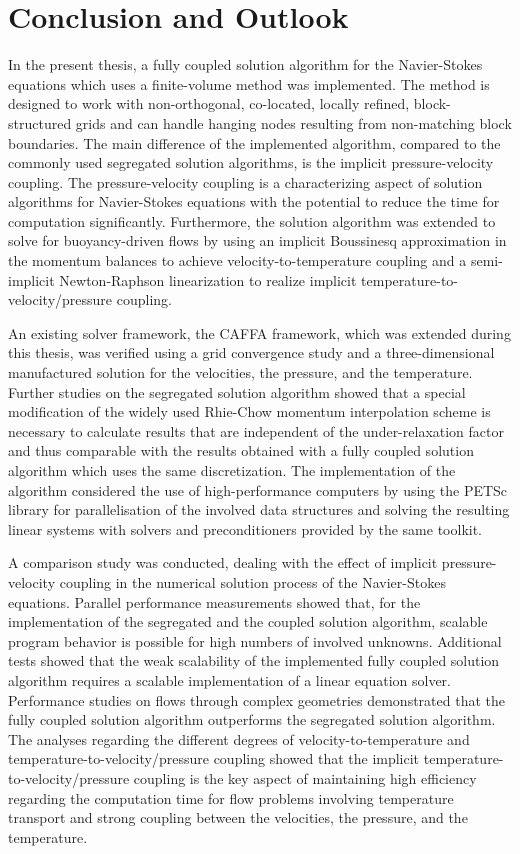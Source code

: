 \chapter{Conclusion and Outlook}
\label{sec:conclusion}

In the present thesis, a fully coupled solution algorithm for the Navier-Stokes equations which uses a finite-volume method was implemented. The method is designed to work with non-orthogonal, co-located, locally refined, block-structured grids and can handle hanging nodes resulting from non-matching block boundaries. The main difference of the implemented algorithm, compared to the commonly used segregated solution algorithms, is the implicit pressure-velocity coupling. The pressure-velocity coupling is a characterizing aspect of solution algorithms for Navier-Stokes equations with the potential to reduce the time for computation significantly. Furthermore, the solution algorithm was extended to solve for buoyancy-driven flows by using an implicit Boussinesq approximation in the momentum balances to achieve velocity-to-temperature coupling and a semi-implicit Newton-Raphson linearization to realize implicit temperature-to-velocity/pressure coupling.

An existing solver framework, the CAFFA framework, which was extended during this thesis, was verified using a grid convergence study and a three-dimensional manufactured solution for the velocities, the pressure, and the temperature. Further studies on the segregated solution algorithm showed that a special modification of the widely used Rhie-Chow momentum interpolation scheme is necessary to calculate results that are independent of the under-relaxation factor and thus comparable with the results obtained with a fully coupled solution algorithm which uses the same discretization. The implementation of the algorithm considered the use of high-performance computers by using the PETSc library for parallelisation of the involved data structures and solving the resulting linear systems with solvers and preconditioners provided by the same toolkit.

A comparison study was conducted, dealing with the effect of implicit pressure-velocity coupling in the numerical solution process of the Navier-Stokes equations. Parallel performance measurements showed that, for the implementation of the segregated and the coupled solution algorithm, scalable program behavior is possible for high numbers of involved unknowns. Additional tests showed that the weak scalability of the implemented fully coupled solution algorithm requires a scalable implementation of a linear equation solver. Performance studies on flows through complex geometries demonstrated that the fully coupled solution algorithm outperforms the segregated solution algorithm. The analyses regarding the different degrees of velocity-to-temperature and temperature-to-velocity/pressure coupling showed that the implicit temperature-to-velocity/pressure coupling is the key aspect of maintaining high efficiency regarding the computation time for flow problems involving temperature transport and strong coupling between the velocities, the pressure, and the temperature.

